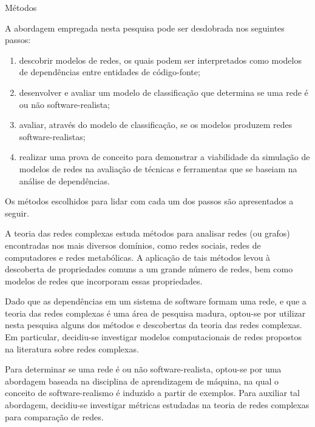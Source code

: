 \begin{section}{Métodos}
	
	A abordagem empregada nesta pesquisa pode ser desdobrada nos seguintes passos:
	
	\begin{enumerate}
		\item descobrir modelos de redes, os quais podem ser interpretados como modelos de dependências entre entidades de código-fonte;
		\item desenvolver e avaliar um modelo de classificação que determina se uma rede é ou não software-realista;
		\item avaliar, através do modelo de classificação, se os modelos produzem redes software-realistas;
		\item realizar uma prova de conceito para demonstrar a viabilidade da simulação de modelos de redes na avaliação de técnicas e ferramentas que se baseiam na análise de dependências.
	\end{enumerate}
	
	Os métodos escolhidos para lidar com cada um dos passos são apresentados a seguir.
	
	A teoria das redes complexas estuda métodos para analisar redes (ou grafos) encontradas nos mais diversos domínios, como redes sociais, redes de computadores e redes metabólicas. A aplicação de tais métodos levou à descoberta de propriedades comuns a um grande número de redes, bem como modelos de redes que incorporam essas propriedades.
	
	Dado que as dependências em um sistema de software formam uma rede, e que a teoria das redes complexas é uma área de pesquisa madura, optou-se por utilizar nesta pesquisa alguns dos métodos e descobertas da teoria das redes complexas. Em particular, decidiu-se investigar modelos computacionais de redes propostos na literatura sobre redes complexas.

	Para determinar se uma rede é ou não software-realista, optou-se por uma abordagem baseada na disciplina de aprendizagem de máquina, na qual o conceito de software-realismo é induzido a partir de exemplos. Para auxiliar tal abordagem, decidiu-se investigar métricas estudadas na teoria de redes complexas para comparação de redes.
	
	

\end{section}

